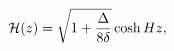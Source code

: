 \begin{equation}
{\cal H}(z)= \sqrt{1+\frac{\Delta}{8 \delta}} \cosh{H z},
\label{eq:background_positive} 
\end{equation}

